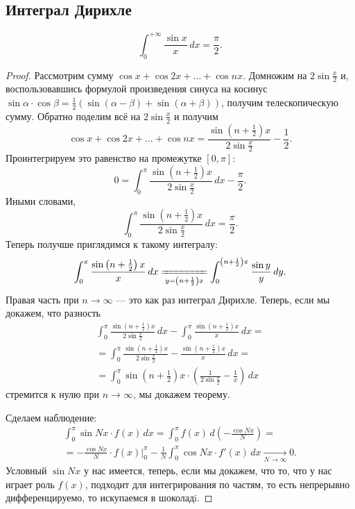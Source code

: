 \subsection{Интеграл Дирихле}

\begin{theorem}
	\[
	\int_{0}^{+\infty} \frac{\sin x}{x} \, dx = \frac{\pi}{2}.
	\]
\end{theorem}
\begin{proof}
	Рассмотрим сумму \(\cos x + \cos 2x + \ldots + \cos nx\). Домножим на \(2 \sin \frac{x}{2}\) и, воспользовавшись формулой произведения синуса на косинус \(\sin \alpha \cdot \cos \beta = \frac{1}{2} (\sin(\alpha - \beta) + \sin(\alpha + \beta))\), получим телескопическую сумму. Обратно поделим всё на \(2 \sin \frac{x}{2}\) и получим \[
	\cos x + \cos 2x + \ldots + \cos nx = \frac{\sin \left(n + \frac{1}{2} \right)x}{2 \sin \frac{x}{2}} - \frac{1}{2}.
	\]
	Проинтегрируем это равенство на промежутке  \([0, \pi]\): \[
	0 = \int_{0}^{\pi} \frac{\sin \left(n + \frac{1}{2} \right)x}{2 \sin \frac{x}{2}} \, dx - \frac{\pi}{2}.
	\]
	Иными словами, \[
	\int_{0}^{\pi} \frac{\sin \left(n + \frac{1}{2} \right)x}{2 \sin \frac{x}{2}} \, dx = \frac{\pi}{2}.
	\]
	Теперь получше приглядимся к такому интегралу: \[
	\int_{0}^{\pi} \frac{\sin \left(n + \frac{1}{2} \right)x}{x} \, dx \xlongequal[y = \left(n + \frac{1}{2} \right)x]{} \int_{0}^{\left(n + \frac{1}{2} \right)\pi} \frac{\sin y}{y} \, dy.
	\]
	Правая часть при  \(n \to \infty\) --- это как раз интеграл Дирихле.
	Теперь, если мы докажем, что разность
	\begin{multline*}
		\int_{0}^{\pi} \frac{\sin \left(n + \frac{1}{2} \right)x}{2 \sin \frac{x}{2}} \, dx - \int_{0}^{\pi} \frac{\sin \left(n + \frac{1}{2} \right)x}{x} \, dx = \\
		= \int_{0}^{\pi} \frac{\sin \left(n + \frac{1}{2} \right)x}{2 \sin \frac{x}{2}} - \frac{\sin \left(n + \frac{1}{2} \right)x}{x} \, dx = \\
		= \int_{0}^{\pi} \sin \left(n + \tfrac{1}{2} \right)x \cdot \left(\frac{1}{2 \sin \frac{x}{2}} - \frac{1}{x}\right) \, dx
	\end{multline*}
	стремится к нулю при \(n \to \infty\), мы докажем теорему.
	
	Сделаем наблюдение: 
	\begin{multline*}
		\int_{0}^{\pi} \sin Nx \cdot f(x) \, dx = \int_{0}^{\pi} f(x) \, d\left(-\frac{\cos Nx}{N} \right) = \\
		= -\frac{\cos Nx}{N} \cdot f(x) \bigg|_{0}^{\pi}  - \frac{1}{N} \int_{0}^{\pi} \cos Nx \cdot f'(x) \, dx \xrightarrow[N \to \infty]{} 0.
	\end{multline*}
	Условный \(\sin Nx\) у нас имеется, теперь, если мы докажем, что то, что у нас играет роль \(f(x)\), подходит для интегрирования по частям, то есть непрерывно дифференцируемо, то искупаемся в шоколадi.
	

\end{proof}
